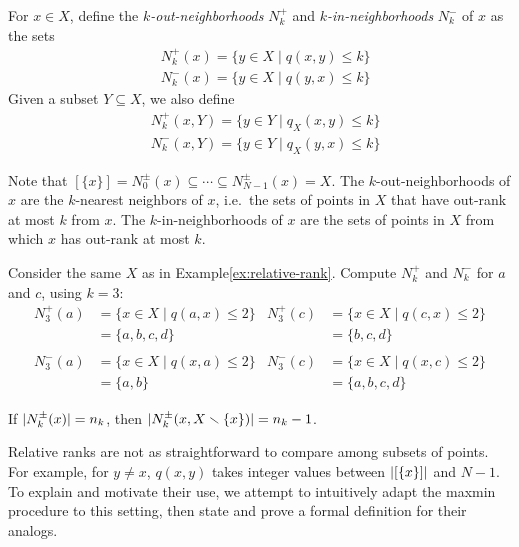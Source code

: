 \documentclass[
]{article}
\begin{document}
\begin{definition}[$k$-neighborhoods]
    For $x \in X$, define the \emph{$k$-out-neighborhoods} $N^+_k$ and \emph{$k$-in-neighborhoods} $N^-_k$ of $x$ as the sets
    \begin{align*}
        & N^+_k(x)=\{y\in X\mid q(x,y)\leq k\} \\
        & N^-_k(x)=\{y\in X\mid q(y,x)\leq k\}
    \end{align*}
    Given a subset $Y \subseteq X$, we also define
    \begin{align*}
        & N^+_k(x,Y)=\{y\in Y\mid q_X(x,y)\leq k\} \\
        & N^-_k(x,Y)=\{y\in Y\mid q_X(y,x)\leq k\}
    \end{align*}
\end{definition}

Note that
\([\{x\}] = N^\pm_0(x) \subseteq \cdots \subseteq N^\pm_{N-1}(x) = X\).
The \(k\)-out-neighborhoods of \(x\) are the \(k\)-nearest neighbors of
\(x\), i.e.~the sets of points in \(X\) that have out-rank at most \(k\)
from \(x\). The \(k\)-in-neighborhoods of \(x\) are the sets of points
in \(X\) from which \(x\) has out-rank at most \(k\).

\begin{example}\label{ex:rank-neighborhoods}
Consider the same $X$ as in Example\nbs\ref{ex:relative-rank}. Compute $N_k^+$ and $N_k^-$ for $a$ and $c$, using $k = 3$:
\begin{align*}
    N_3^+ (a) &= \{x \in X \mid q(a,x) \leq 2\} &
    N_3^+ (c) &= \{x \in X \mid q(c,x) \leq 2\} \\
    &= \{a, b, c, d\} &
    &= \{b, c, d\} \\
    \\
    N_3^- (a) &= \{x \in X \mid q(x,a) \leq 2\} &
    N_3^- (c) &= \{x \in X \mid q(x,c) \leq 2\} \\
    &= \{a, b\} &
    &= \{a, b, c, d\}
\end{align*}
\end{example}

\begin{remark}
If $\lvert N^\pm_k(x)\rvert = n_k$, then $\lvert N^\pm_k(x,X\smallsetminus\{x\})\rvert = n_k - 1$.
\end{remark}

Relative ranks are not as straightforward to compare among subsets of
points. For example, for \(y\neq x\), \(q(x,y)\) takes integer values
between \(\lvert [\{x\}]\rvert\) and \(N-1\). To explain and motivate
their use, we attempt to intuitively adapt the maxmin procedure to this
setting, then state and prove a formal definition for their analogs.
\end{document}
